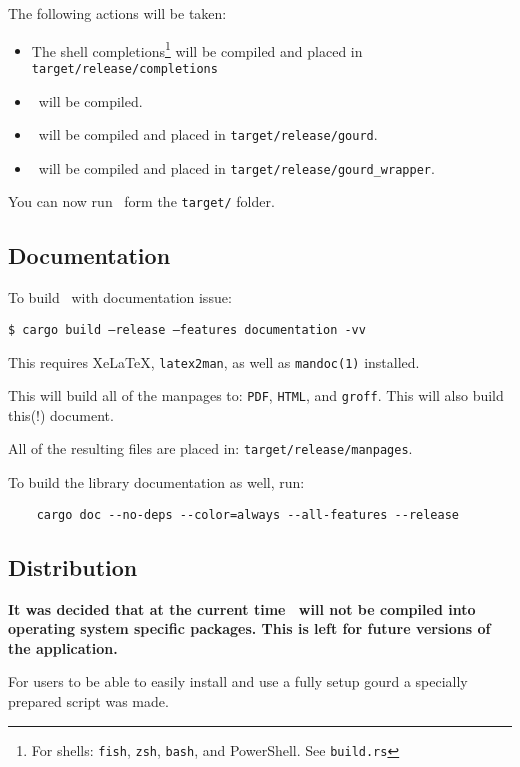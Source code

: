 \noindent The following actions will be taken:

\begin{itemize}
  \item The shell completions\footnote{For shells: \texttt{fish}, \texttt{zsh}, \texttt{bash}, and PowerShell. See \texttt{build.rs}}
  will be compiled and placed in \texttt{target/release/completions}
  \item \gourdlib\ will be compiled.
  \item \gourd\ will be compiled and placed in \texttt{target/release/gourd}.
  \item \gourdwrap\ will be compiled and placed in \texttt{target/release/gourd\_wrapper}.
\end{itemize}

You can now run \gourd\ form the \texttt{target/} folder.

\subsection{Documentation}
\label{sec:docbuild}

To build \gourd\ with documentation issue:

\texttt{\$ cargo build --release --features documentation -vv}
\vspace{0.5cm}

\noindent This requires Xe\LaTeX, \texttt{latex2man}, as well as \texttt{mandoc(1)} installed.

This will build all of the manpages to: \texttt{PDF}, \texttt{HTML}, and \texttt{groff}.
This will also build this(!) document.

All of the resulting files are placed in: \texttt{target/release/manpages}.

To build the library documentation as well, run:
\begin{verbatim}
    cargo doc --no-deps --color=always --all-features --release
\end{verbatim}

\subsection{Distribution}
\textcolor{red!30!black}{\textbf{
  It was decided that at the current time \gourd\ will not be compiled into
  operating system specific packages. This is left for future versions of the application.
}}
\vspace{0.3cm}

For users to be able to easily install and use a fully setup gourd a specially prepared script was made.


